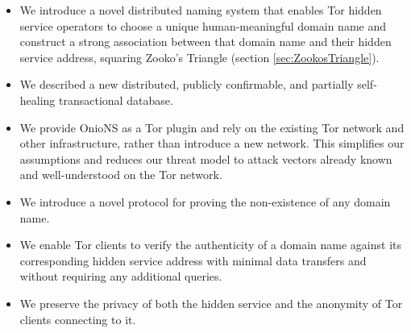 \begin{itemize}
	\item We introduce a novel distributed naming system that enables Tor hidden service operators to choose a unique human-meaningful domain name and construct a strong association between that domain name and their hidden service address, squaring Zooko's Triangle (section \ref{sec:ZookosTriangle}).
	\item We described a new distributed, publicly confirmable, and partially self-healing transactional database.
	\item We provide OnioNS as a Tor plugin and rely on the existing Tor network and other infrastructure, rather than introduce a new network. This simplifies our assumptions and reduces our threat model to attack vectors already known and well-understood on the Tor network.
	\item We introduce a novel protocol for proving the non-existence of any domain name.
	\item We enable Tor clients to verify the authenticity of a domain name against its corresponding hidden service address with minimal data transfers and without requiring any additional queries.
	\item We preserve the privacy of both the hidden service and the anonymity of Tor clients connecting to it.
\end{itemize}
